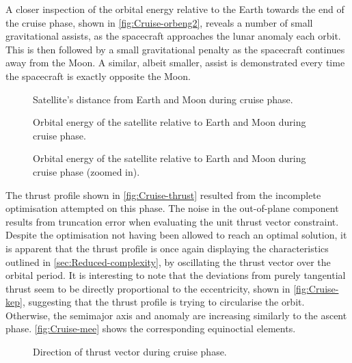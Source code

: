 A closer inspection of the orbital energy relative to the Earth towards the end of the cruise phase, shown in \autoref{fig:Cruise-orbeng2}, reveals a number of small gravitational assists, as the spacecraft approaches the lunar anomaly each orbit. This is then followed by a small gravitational penalty as the spacecraft continues away from the Moon. A similar, albeit smaller, assist is demonstrated every time the spacecraft is exactly opposite the Moon.

\begin{figure}
\centering
\def\svgwidth{\figurewidth}

\caption{Satellite's distance from Earth and Moon during cruise phase.} \label{fig:Cruise-dist}
\end{figure}

\begin{subfigures}
\begin{figure}
\centering
\def\svgwidth{\figurewidth}

\caption{Orbital energy of the satellite relative to Earth and Moon during cruise phase.} \label{fig:Cruise-orbeng}
\end{figure}

\begin{figure}
\centering
\def\svgwidth{\figurewidth}

\caption{Orbital energy of the satellite relative to Earth and Moon during cruise phase (zoomed in).} \label{fig:Cruise-orbeng2}
\end{figure}
\end{subfigures}

The thrust profile shown in \autoref{fig:Cruise-thrust} resulted from the incomplete optimisation attempted on this phase. The noise in the out-of-plane component results from truncation error when evaluating the unit thrust vector constraint. Despite the optimisation not having been allowed to reach an optimal solution, it is apparent that the thrust profile is once again displaying the characteristics outlined in \autoref{sec:Reduced-complexity}, by oscillating the thrust vector over the orbital period. It is interesting to note that the deviations from purely tangential thrust seem to be directly proportional to the eccentricity, shown in \autoref{fig:Cruise-kep}, suggesting that the thrust profile is trying to circularise the orbit. Otherwise, the semimajor axis and anomaly are increasing similarly to the ascent phase. \autoref{fig:Cruise-mee} shows the corresponding equinoctial elements.

\begin{figure}
\centering
\def\svgwidth{\figurewidth}

\caption{Direction of thrust vector during cruise phase.} \label{fig:Cruise-thrust}
\end{figure}

